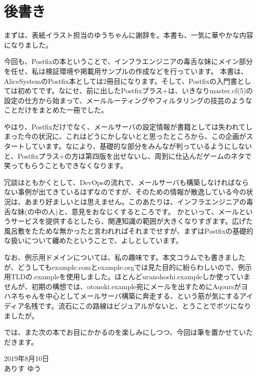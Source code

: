 \section*{後書き}

まずは、表紙イラスト担当のゆうちゃんに謝辞を。本書も、一気に華やかな内容になりました。

今回も、Postfixの本ということで、インフラエンジニアの毒舌な妹にメイン部分を任せ、私は検証環境や掲載用サンプルの作成などを行っています。
本書は、AliceSystemのPostfix本としては2冊目になります。そして、Postfixの入門書としては初めてです。なにせ、前に出したPostfixプラス+は、いきなりmaster.cf(5)の設定の仕方から始まって、メールルーティングやフィルタリングの技芸のようなことだけをまとめた一冊でした。

やはり、Postfixだけでなく、メールサーバの設定情報が書籍としては失われてしまった今の状況に、これはどうにかしないとと思ったところから、この企画がスタートしています。なにより、基礎的な部分をみんなが判っているようにしないと、Postfixプラス+の方は第四版を出せないし、周到に仕込んだゲームのネタで笑ってもらうこともできなくなります。

冗談はともかくとして、DevOpsの流れで、メールサーバも構築しなければならない事例が出てきているはずなのですが、そのための情報が散逸している今の状況は、あまり好ましいとは思えません。このあたりは、インフラエンジニアの毒舌な妹(の中の人)と、意見をおなじくするところです。
かといって、メールというサービスを提供するとしたら、関連知識の範囲が大きくなりすぎます。広げた風呂敷をたためな無かったと言われればそれまでせすが、まずはPostfixの基礎的な扱いについて纏めたということで、よしとしています。

なお、例示用ドメインについては、私の趣味です。本文コラムでも書きましたが、どうしてもexample.comとexample.orgでは見た目的に紛らわしいので、例示用TLDの.exampleを使用しました。ほとんどuranohoshi.exampleしか使っていませんが、初期の構想では、otonoki.example宛にメールを出すためにAqoursがヨハネちゃんを中心としてメールサーバ構築に奔走する、という筋が気にするアイディア名残です。流石にこの路線はビジュアルがないと、とうことでボツになりましたが。

では、また次の本でお目にかかるのを楽しみにしつつ、今回は筆を置かせていただきます。

\begin{flushright}
2019年8月10日 \\
ありす ゆう
\end{flushright}




